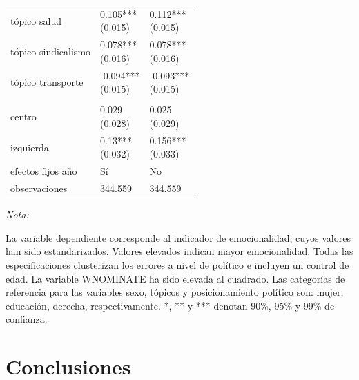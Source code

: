 \documentclass[
  12pt,
]{article}
\begin{document}
\begin{table}[H]
\begin{threeparttable}
\begin{tabular}[t]{lll}
\hspace{1em}tópico salud & \makecell[l]{0.105***\\ (0.015)} & \makecell[l]{0.112***\\ (0.015)}\\
\hspace{1em}tópico sindicalismo & \makecell[l]{0.078***\\ (0.016)} & \makecell[l]{0.078***\\ (0.016)}\\
\hspace{1em}tópico transporte & \makecell[l]{-0.094***\\ (0.015)} & \makecell[l]{-0.093***\\ (0.015)}\\
\addlinespace[0.3em]
\multicolumn{3}{l}{\textbf{Posicionamiento político}}\\
\hspace{1em}centro & \makecell[l]{0.029\\ (0.028)} & \makecell[l]{0.025\\ (0.029)}\\
\hspace{1em}izquierda & \makecell[l]{0.13***\\ (0.032)} & \makecell[l]{0.156***\\ (0.033)}\\
efectos fijos año & Sí & No\\
observaciones & 344.559 & 344.559\\
\bottomrule
\end{tabular}
\begin{tablenotes}[para]
\small
\item \textit{Nota:} 
\item La variable dependiente corresponde al indicador de emocionalidad, cuyos valores han sido estandarizados. Valores elevados indican mayor emocionalidad. Todas las especificaciones clusterizan los errores a nivel de político e incluyen un control de edad. La variable WNOMINATE ha sido elevada al cuadrado. Las categorías de referencia para las variables sexo, tópicos y posicionamiento político son: mujer, educación, derecha, respectivamente. *, ** y *** denotan 90\%, 95\% y 99\% de confianza.
\end{tablenotes}
\end{threeparttable}
\end{table}

\newpage

\hypertarget{conclusiones}{%
\section{Conclusiones}\label{conclusiones}}
\end{document}
